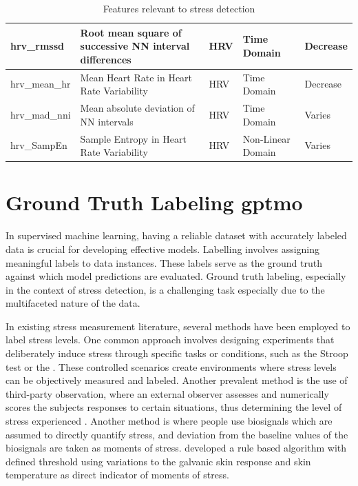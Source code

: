 \begin{table}[!htbp]
{\begin{tabular}{|l|p{4cm}|l|l|l|}
  hrv\_rmssd              & Root mean square of successive NN interval differences        & HRV                   & Time Domain     & Decrease        \\ \hline
  hrv\_mean\_hr            & Mean Heart Rate in Heart Rate Variability                     & HRV                   & Time Domain     & Decrease        \\ \hline
  hrv\_mad\_nni           & Mean absolute deviation of NN intervals                         & HRV                   & Time Domain     & Varies          \\ \hline
  hrv\_SampEn              & Sample Entropy in Heart Rate Variability                      & HRV                   & Non-Linear Domain & Varies          \\ \hline
  \end{tabular}}
  \caption{Features relevant to stress detection}
  \label{tab:stress_features}
\end{table}



\section{Ground Truth Labeling \gls{gptmo}}
In supervised machine learning, having a reliable dataset with accurately labeled data is crucial for developing effective models. Labelling involves assigning meaningful labels to data instances. These labels serve as the ground truth against which model predictions are evaluated. Ground truth labeling, especially in the context of stress detection, is a challenging task especially due to the multifaceted nature of the data.


In existing stress measurement literature, several methods have been employed to label stress levels. One common approach involves designing experiments that deliberately induce stress through specific tasks or conditions, such as the Stroop test\parencite{stroop} or the  \parencites{alsha}{swell}{wesad}{4242}. These controlled scenarios create environments where stress levels can be objectively measured and labeled. Another prevalent method is the use of third-party observation, where an external observer assesses and numerically scores the subjects responses to certain situations, thus determining the level of stress experienced \parencites{aigram}{Jin_2020}{Siirtola2020-wp}. Another method is where people use biosignals which are assumed to directly quantify stress, and deviation from the baseline values of the biosignals are taken as moments of stress. \textcite{Kyriakou2019-dc} developed a rule based algorithm with defined threshold using variations to the galvanic skin response and skin temperature as direct indicator of moments of stress. 


